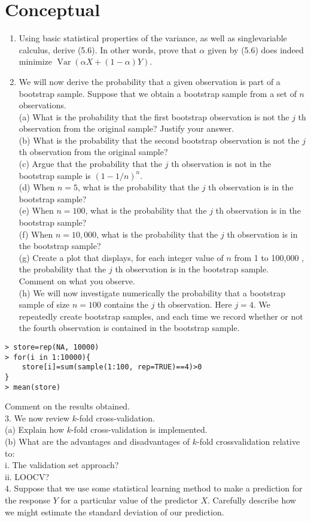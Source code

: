 \documentclass[10pt]{article}
\begin{document}
\section*{Conceptual}
\begin{enumerate}
  \item Using basic statistical properties of the variance, as well as singlevariable calculus, derive (5.6). In other words, prove that $\alpha$ given by (5.6) does indeed minimize $\operatorname{Var}(\alpha X+(1-\alpha) Y)$.
  \item We will now derive the probability that a given observation is part of a bootstrap sample. Suppose that we obtain a bootstrap sample from a set of $n$ observations.\\
(a) What is the probability that the first bootstrap observation is not the $j$ th observation from the original sample? Justify your answer.\\
(b) What is the probability that the second bootstrap observation is not the $j$ th observation from the original sample?\\
(c) Argue that the probability that the $j$ th observation is not in the bootstrap sample is $(1-1 / n)^{n}$.\\
(d) When $n=5$, what is the probability that the $j$ th observation is in the bootstrap sample?\\
(e) When $n=100$, what is the probability that the $j$ th observation is in the bootstrap sample?\\
(f) When $n=10,000$, what is the probability that the $j$ th observation is in the bootstrap sample?\\
(g) Create a plot that displays, for each integer value of $n$ from 1 to 100,000 , the probability that the $j$ th observation is in the bootstrap sample. Comment on what you observe.\\
(h) We will now investigate numerically the probability that a bootstrap sample of size $n=100$ contains the $j$ th observation. Here $j=4$. We repeatedly create bootstrap samples, and each time we record whether or not the fourth observation is contained in the bootstrap sample.
\end{enumerate}

\begin{verbatim}
> store=rep(NA, 10000)
> for(i in 1:10000){
    store[i]=sum(sample(1:100, rep=TRUE)==4)>0
}
> mean(store)
\end{verbatim}

Comment on the results obtained.\\
3. We now review $k$-fold cross-validation.\\
(a) Explain how $k$-fold cross-validation is implemented.\\
(b) What are the advantages and disadvantages of $k$-fold crossvalidation relative to:\\
i. The validation set approach?\\
ii. LOOCV?\\
4. Suppose that we use some statistical learning method to make a prediction for the response $Y$ for a particular value of the predictor $X$. Carefully describe how we might estimate the standard deviation of our prediction.
\end{document}
